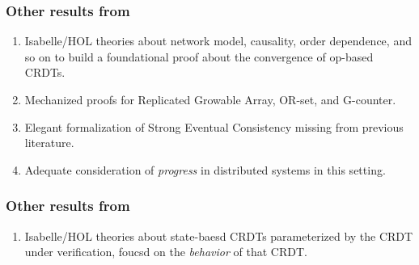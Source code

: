 \documentclass[aspectratio=169,compress]{beamer}
\begin{document}
  \begin{frame}
    \frametitle{Other results from~\cite{gomes17}}
    \begin{enumerate}
      \item Isabelle/HOL theories about network model, causality, order
        dependence, and so on to build a foundational proof about the
        convergence of op-based CRDTs.
      \item Mechanized proofs for Replicated Growable Array, OR-set, and
        G-counter.
      \item Elegant formalization of Strong Eventual Consistency missing from
        previous literature.
      \item Adequate consideration of \textit{progress} in distributed systems
        in this setting.
    \end{enumerate}
  \end{frame}

  \begin{frame}
    \frametitle{Other results from~\cite{zeller14}}
    \begin{enumerate}
      \item Isabelle/HOL theories about state-baesd CRDTs parameterized by the
        CRDT under verification, foucsd on the \textit{behavior} of that CRDT.
    \end{enumerate}
  \end{frame}

  \begin{frame}
    \printbibliography
  \end{frame}
\end{document}
